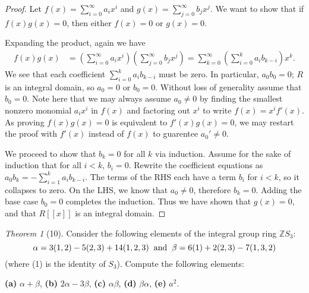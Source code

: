 \documentclass[12pt]{article}
\theoremstyle{remark}
\theoremstyle{named}
\newtheorem*{theorem}{Theorem}
\renewcommand{\a}{\alpha}
\renewcommand{\b}{\beta}
\newcommand{\Z}{\mathbb Z}
\begin{document}
\begin{proof}
    Let \(f(x) = \sum_{i = 0}^\infty a_i x^i\) and \(g(x) = \sum_{j = 0}^\infty b_j x^j\). We want to show that if \(f(x)g(x) = 0\), then either \(f(x) = 0\) or \(g(x) = 0\). 

    Expanding the product, again we have 
    \begin{align*}
        f(x)g(x) &= \left(\sum_{i = 0}^\infty a_i x^i\right)\left(\sum_{j = 0}^\infty b_j x^j\right) = \sum_{k = 0}^\infty \left(\sum_{i = 0}^k a_i b_{k - i}\right) x^k.
    \end{align*}
    We see that each coefficient \(\sum_{i = 0}^k a_i b_{k - i}\) must be zero. In particular, \(a_0 b_0 = 0\); \(R\) is an integral domain, so \(a_0 = 0\) or \(b_0 = 0\). Without loss of generality assume that \(b_0 = 0\). Note here that we may always assume \(a_0 \neq 0\) by finding the smallest nonzero monomial \(a_i x^i\) in \(f(x)\) and factoring out \(x^i\) to write \(f(x) = x^i f'(x)\). As proving \(f(x)g(x) = 0\) is equivalent to \(f'(x)g(x) = 0\), we may restart the proof with \(f'(x)\) instead of \(f(x)\) to guarentee \(a_0' \neq 0\). 

    We proceed to show that \(b_k = 0\) for all \(k\) via induction. Assume for the sake of induction that for all \(i < k\), \(b_i = 0\). Rewrite the coefficient equations as \(a_0 b_k = - \sum_{i = 1}^k a_i b_{k - i}\). The terms of the RHS each have a term \(b_i\) for \(i < k\), so it collapses to zero. On the LHS, we know that \(a_0 \neq 0\), therefore \(b_k = 0\). Adding the base case \(b_0 = 0\) completes the induction. Thus we have shown that \(g(x) = 0\), and that \(R[[x]]\) is an integral domain.  
\end{proof}

\begin{theorem}[10]
    Consider the following elements of the integral group ring \(\Z S_3\):
    \[\a = 3(1, 2) - 5(2, 3) + 14(1, 2, 3) \hspace{2mm} \text{and} \hspace{2mm} \b = 6(1) + 2(2, 3) - 7(1, 3, 2)\]
    (where (1) is the identity of \(S_3\)). Compute the following elements:

    \textbf{(a)} \(\a + \b\), \textbf{(b)} \(2\a - 3\b\), \textbf{(c)} \(\a \b\), \textbf{(d)} \(\b\a\), \textbf{(e)} \(a^2\).
\end{theorem}
\end{document}
